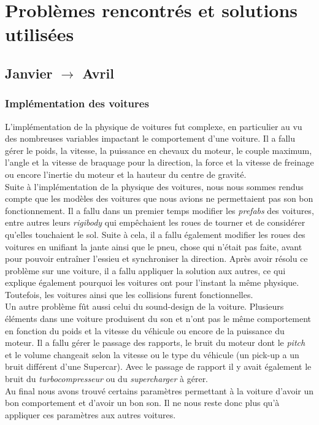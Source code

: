 \documentclass[a4paper,12pt]{article}
\begin{document}
        \clearpage
    \section{Problèmes rencontrés et solutions utilisées}
        \subsection{Janvier $\to$ Avril}
         \subsubsection{Implémentation des voitures}
                L'implémentation de la physique de voitures fut complexe, en particulier au vu des 
                nombreuses variables impactant le comportement d'une voiture. Il a fallu gérer le 
                poids, la vitesse, la puissance en chevaux du moteur, le couple maximum, l'angle et la 
                vitesse de braquage pour la direction, la force et la vitesse de freinage ou encore 
                l'inertie du moteur et la hauteur du centre de gravité.\\
                Suite à l'implémentation de la physique des voitures, nous nous sommes rendus compte que 
                les modèles des voitures que nous avions ne permettaient pas son bon fonctionnement. Il 
                a fallu dans un premier temps modifier les \textit{prefabs} des voitures, entre autres 
                leurs \textit{rigibody} qui empêchaient les roues de tourner et de considérer qu'elles 
                touchaient le sol. Suite à cela, il a fallu également modifier les roues des voitures en
                unifiant la jante ainsi que le pneu, chose qui n'était pas faite, avant pour pouvoir 
                entraîner l'essieu et synchroniser la direction. Après avoir résolu ce problème sur une 
                voiture, il a fallu appliquer la solution aux autres, ce qui explique également pourquoi les 
                voitures ont pour l'instant la même physique. Toutefois, les voitures ainsi que les 
                collisions furent fonctionnelles.\\
                Un autre problème fût aussi celui du sound-design de la voiture. Plusieurs éléments dans
                une voiture produisent du son et n'ont pas le même comportement en fonction du poids et
                la vitesse du véhicule ou encore de la puissance du moteur. Il a fallu gérer le passage
                des rapports, le bruit du moteur dont le \textit{pitch} et le volume changeait selon la
                vitesse ou le type du véhicule (un pick-up a un bruit différent d'une Supercar). Avec le
                passage de rapport il y avait également le bruit du \textsl{turbocompresseur} ou du
                \textsl{supercharger} à gérer.\\
                Au final nous avons trouvé certains paramètres permettant à la voiture d'avoir un bon
                comportement et d'avoir un bon son. Il ne nous reste donc plus qu'à appliquer ces paramètres
                aux autres voitures.
\end{document}
